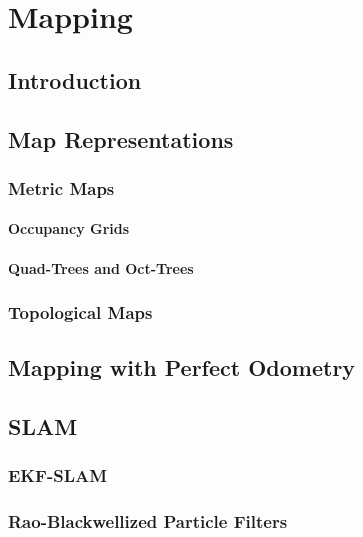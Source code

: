 \chapter{Mapping}

\section{Introduction}

\section{Map Representations}

\subsection{Metric Maps}

\subsubsection{Occupancy Grids}
\subsubsection{Quad-Trees and Oct-Trees}

\subsection{Topological Maps}


\section{Mapping with Perfect Odometry}

\section{SLAM}

\subsection{EKF-SLAM}

\subsection{Rao-Blackwellized Particle Filters}
